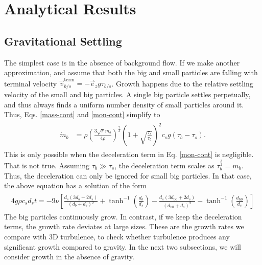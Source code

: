 \documentclass[../Rajarshi-thesis-draft.tex]{subfiles}
\begin{document}
\section{Analytical Results}\label{anltc-res}
\subsection{Gravitational Settling}\label{grav-sett-anltc}
The simplest case is in the absence of background flow. If we make another approximation, and assume that both the big and small particles are falling with terminal velocity $\vec{v}_{b/s}^{\text{term}} = - \vec{e}_{z} g \tau_{b/s}$. Growth happens due to the relative settling velocity of the small and big particles. A single big particle settles perpetually, and thus always finds a uniform number density of small particles around it. Thus, Eqs. \eqref{mass-cont} and \eqref{mon-cont} simplify to 
\begin{align}
\begin{split}
    \dot{m}_b &= \rho \left(\frac{3\sqrt{\pi}m_b}{4\rho}\right)^{\frac23}\left( 1 + \sqrt{\frac{\tau_s}{\tau_b}} \right)^2 c_s g(\tau_b - \tau_s).
\end{split}
\end{align}
This is only possible when the deceleration term in Eq. \eqref{mon-cont} is negligible. That is not true. Assuming $\tau_b \gg \tau_s$, the deceleration term scales as $\tau_b^{\frac32} = m_b$. Thus, the deceleration can only be ignored for small big particles. In that case, the above equation has a solution of the form
\begin{align}
\label{grav-settl-sol}
\begin{split}
    4g \rho  c_s d_st = -9 \nu  \left[\frac{d_s \left(3 d_b+2 d_s\right)}{\left(d_b+d_s\right){}^2}+\tanh ^{-1}\left(\frac{d_b}{d_s}\right)-\frac{d_s \left(3 d_{\text{b0}}+2 d_s\right)}{\left(d_{\text{b0}}+d_s\right)^2}-\tanh ^{-1}\left(\frac{d_{\text{b0}}}{d_s}\right)\right]
\end{split}
\end{align}
The big particles continuously grow. In contrast, if we keep the deceleration terms, the growth rate deviates at large sizes. These are the growth rates we compare with $3$D turbulence, to check whether turbulence produces any significant growth compared to gravity. In the next two subsections, we will consider growth in the absence of gravity. 
\end{document}
